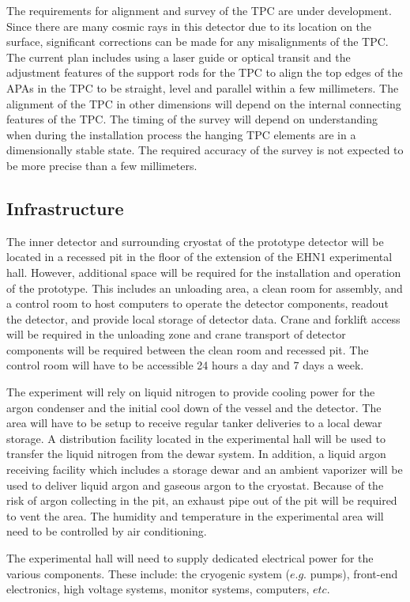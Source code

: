 The requirements for alignment and survey of the TPC are under development. Since there are many cosmic rays in this detector due to its location on the surface, significant corrections can be made for any misalignments of the TPC. The current plan includes using a laser guide or optical transit and the adjustment features of the support rods for the TPC to align the top edges of the APAs in the TPC to be straight, level and parallel within a few millimeters. The alignment of the TPC in other dimensions will depend on the internal connecting features of the TPC.  The timing of the survey will depend on understanding when during the installation process the hanging TPC elements are in a dimensionally stable state. The required accuracy of the survey is not expected to be more precise than a few millimeters.  


\subsection{Infrastructure}

The inner detector and surrounding cryostat of the prototype detector will be located in a recessed pit in the floor of the extension of the EHN1 experimental hall.  However, additional space will be required for the installation and operation of the prototype.  This includes an unloading area, a clean room for assembly, and a control room to host computers to operate the detector components, readout the detector, and provide local storage of detector data.  Crane and forklift access will be required in the unloading zone and crane transport of detector components will be required between the clean room and recessed pit.  The control room will have to be accessible 24 hours a day and 7 days a week.

The experiment will rely on liquid nitrogen to provide cooling power for the argon condenser and the initial cool down of the vessel and the detector.  The area will have to be setup to receive regular tanker deliveries to a local dewar storage.  A distribution facility located in the experimental hall will be used to transfer the liquid nitrogen from the dewar system.  In addition, a liquid argon receiving facility which includes a storage dewar and an ambient vaporizer will be used to deliver liquid argon and gaseous argon to the cryostat.  Because of the risk of argon collecting in the pit, an exhaust pipe out of the pit will be required to vent the area.  The humidity and temperature in the experimental area will need to be controlled by air conditioning.   

The experimental hall will need to supply dedicated electrical power for the various components. These include:
the cryogenic system ($e.g.$ pumps), front-end electronics, high voltage systems, monitor systems, computers, $etc.$


